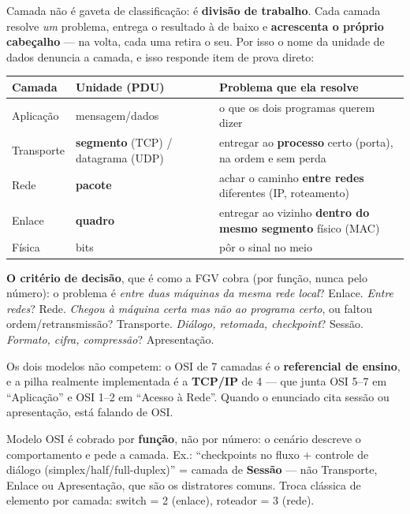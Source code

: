 \begin{conceito}
Camada não é gaveta de classificação: é \textbf{divisão de trabalho}. Cada
camada resolve \emph{um} problema, entrega o resultado à de baixo e
\textbf{acrescenta o próprio cabeçalho} --- na volta, cada uma retira o seu.
Por isso o nome da unidade de dados denuncia a camada, e isso responde item de
prova direto:

\begin{center}
\begin{tabular}{@{}p{2.7cm}p{3.1cm}p{5.3cm}@{}}
\toprule
\textbf{Camada} & \textbf{Unidade (PDU)} & \textbf{Problema que ela resolve} \\
\midrule
Aplicação & mensagem/dados & o que os dois programas querem dizer \\
Transporte & \textbf{segmento} (TCP) / datagrama (UDP) & entregar ao
\textbf{processo} certo (porta), na ordem e sem perda \\
Rede & \textbf{pacote} & achar o caminho \textbf{entre redes} diferentes (IP,
roteamento) \\
Enlace & \textbf{quadro} & entregar ao vizinho \textbf{dentro do mesmo
segmento} físico (MAC) \\
Física & bits & pôr o sinal no meio \\
\bottomrule
\end{tabular}
\end{center}

\textbf{O critério de decisão}, que é como a FGV cobra (por função, nunca pelo
número): o problema é \emph{entre duas máquinas da mesma rede local}? Enlace.
\emph{Entre redes}? Rede. \emph{Chegou à máquina certa mas não ao programa
certo}, ou faltou ordem/retransmissão? Transporte. \emph{Diálogo, retomada,
checkpoint}? Sessão. \emph{Formato, cifra, compressão}? Apresentação.

Os dois modelos não competem: o OSI de 7 camadas é o \textbf{referencial de
ensino}, e a pilha realmente implementada é a \textbf{TCP/IP} de 4 --- que junta
OSI 5--7 em ``Aplicação'' e OSI 1--2 em ``Acesso à Rede''. Quando o enunciado
cita sessão ou apresentação, está falando de OSI.
\end{conceito}

\begin{pegadinha}
Modelo OSI é cobrado por \textbf{função}, não por número: o cenário descreve
o comportamento e pede a camada. Ex.: ``checkpoints no fluxo + controle de
diálogo (simplex/half/full-duplex)'' = camada de \textbf{Sessão} --- não
Transporte, Enlace ou Apresentação, que são os distratores comuns. Troca
clássica de elemento por camada: switch = 2 (enlace), roteador = 3 (rede).
\end{pegadinha}

